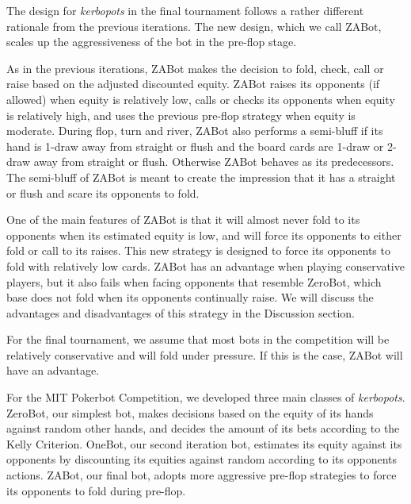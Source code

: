 The design for \emph{kerbopots} in the final tournament follows a rather different rationale from the previous iterations. The new design, which we call ZABot, scales up the aggressiveness of the bot in the pre-flop stage.

As in the previous iterations, ZABot makes the decision to fold, check, call or raise based on the adjusted discounted equity. ZABot raises its opponents (if allowed) when equity is relatively low, calls or checks its opponents when equity is relatively high, and uses the previous pre-flop strategy when equity is moderate. During flop, turn and river, ZABot also performs a semi-bluff if its hand is 1-draw away from straight or flush and the board cards are 1-draw or 2-draw away from straight or flush. Otherwise ZABot behaves as its predecessors. The semi-bluff of ZABot is meant to create the impression that it has a straight or flush and scare its opponents to fold.

One of the main features of ZABot is that it will almost never fold to its opponents when its estimated equity is low, and will force its opponents to either fold or call to its raises. This new strategy is designed to force its opponents to fold with relatively low cards. ZABot has an advantage when playing conservative players, but it also fails when facing opponents that resemble ZeroBot, which base does not fold when its opponents continually raise. We will discuss the advantages and disadvantages of this strategy in the Discussion section.

For the final tournament, we assume that most bots in the competition will be relatively conservative and will fold under pressure. If this is the case, ZABot will have an advantage.

For the MIT Pokerbot Competition, we developed three main classes of \emph{kerbopots}. ZeroBot, our simplest bot, makes decisions based on the equity of its hands against random other hands, and decides the amount of its bets according to the Kelly Criterion. OneBot, our second iteration bot, estimates its equity against its opponents by discounting its equities against random according to its opponents actions. ZABot, our final bot, adopts more aggressive pre-flop strategies to force its opponents to fold during pre-flop.

